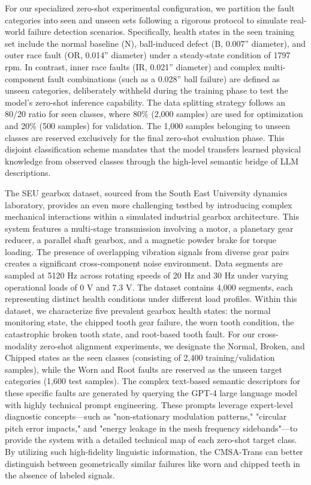 \documentclass[journal]{IEEEtran}
\begin{document}
For our specialized zero-shot experimental configuration, we partition the fault categories into seen and unseen sets following a rigorous protocol to simulate real-world failure detection scenarios. Specifically, health states in the seen training set include the normal baseline (N), ball-induced defect (B, 0.007'' diameter), and outer race fault (OR, 0.014'' diameter) under a steady-state condition of 1797 rpm. In contrast, inner race faults (IR, 0.021'' diameter) and complex multi-component fault combinations (such as a 0.028'' ball failure) are defined as unseen categories, deliberately withheld during the training phase to test the model's zero-shot inference capability. The data splitting strategy follows an 80/20 ratio for seen classes, where 80\% (2,000 samples) are used for optimization and 20\% (500 samples) for validation. The 1,000 samples belonging to unseen classes are reserved exclusively for the final zero-shot evaluation phase. This disjoint classification scheme mandates that the model transfers learned physical knowledge from observed classes through the high-level semantic bridge of LLM descriptions.

The SEU gearbox dataset, sourced from the South East University dynamics laboratory, provides an even more challenging testbed by introducing complex mechanical interactions within a simulated industrial gearbox architecture. This system features a multi-stage transmission involving a motor, a planetary gear reducer, a parallel shaft gearbox, and a magnetic powder brake for torque loading. The presence of overlapping vibration signals from diverse gear pairs creates a significant cross-component noise environment. Data segments are sampled at 5120 Hz across rotating speeds of 20 Hz and 30 Hz under varying operational loads of 0 V and 7.3 V. The dataset contains 4,000 segments, each representing distinct health conditions under different load profiles. Within this dataset, we characterize five prevalent gearbox health states: the normal monitoring state, the chipped tooth gear failure, the worn tooth condition, the catastrophic broken tooth state, and root-based tooth fault. For our cross-modality zero-shot alignment experiments, we designate the Normal, Broken, and Chipped states as the seen classes (consisting of 2,400 training/validation samples), while the Worn and Root faults are reserved as the unseen target categories (1,600 test samples). The complex text-based semantic descriptors for these specific faults are generated by querying the GPT-4 large language model with highly technical prompt engineering. These prompts leverage expert-level diagnostic concepts—such as "non-stationary modulation patterns," "circular pitch error impacts," and "energy leakage in the mesh frequency sidebands"—to provide the system with a detailed technical map of each zero-shot target class. By utilizing such high-fidelity linguistic information, the CMSA-Trans can better distinguish between geometrically similar failures like worn and chipped teeth in the absence of labeled signals.
\end{document}
